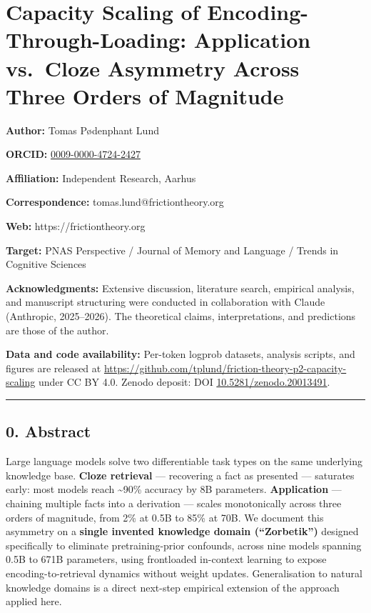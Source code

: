 \documentclass[
]{article}
\author{}
\date{}
\begin{document}
\section{Capacity Scaling of Encoding-Through-Loading: Application
vs.~Cloze Asymmetry Across Three Orders of
Magnitude}\label{capacity-scaling-of-encoding-through-loading-application-vs.-cloze-asymmetry-across-three-orders-of-magnitude}

\textbf{Author:} Tomas Pødenphant Lund

\textbf{ORCID:}
\href{https://orcid.org/0009-0000-4724-2427}{0009-0000-4724-2427}

\textbf{Affiliation:} Independent Research, Aarhus

\textbf{Correspondence:} tomas.lund@frictiontheory.org

\textbf{Web:} https://frictiontheory.org

\textbf{Target:} PNAS Perspective / Journal of Memory and Language /
Trends in Cognitive Sciences

\textbf{Acknowledgments:} Extensive discussion, literature search,
empirical analysis, and manuscript structuring were conducted in
collaboration with Claude (Anthropic, 2025--2026). The theoretical
claims, interpretations, and predictions are those of the author.

\textbf{Data and code availability:} Per-token logprob datasets,
analysis scripts, and figures are released at
\url{https://github.com/tplund/friction-theory-p2-capacity-scaling}
under CC BY 4.0. Zenodo deposit: DOI
\href{https://doi.org/10.5281/zenodo.20013491}{10.5281/zenodo.20013491}.

\begin{center}\rule{0.5\linewidth}{0.5pt}\end{center}

\subsection{0. Abstract}\label{abstract}

Large language models solve two differentiable task types on the same
underlying knowledge base. \textbf{Cloze retrieval} --- recovering a
fact as presented --- saturates early: most models reach
\textasciitilde90\% accuracy by 8B parameters. \textbf{Application} ---
chaining multiple facts into a derivation --- scales monotonically
across three orders of magnitude, from 2\% at 0.5B to 85\% at 70B. We
document this asymmetry on a \textbf{single invented knowledge domain
(``Zorbetik'')} designed specifically to eliminate pretraining-prior
confounds, across nine models spanning 0.5B to 671B parameters, using
frontloaded in-context learning to expose encoding-to-retrieval dynamics
without weight updates. Generalisation to natural knowledge domains is a
direct next-step empirical extension of the approach applied here.
\end{document}

